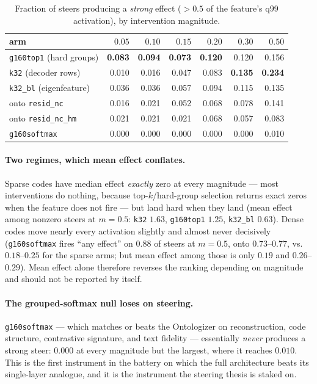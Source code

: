 \documentclass[11pt]{article}
\begin{document}
\begin{table}[h]\centering\small
\begin{tabular}{@{}lrrrrrr@{}}
\toprule
arm & $0.05$ & $0.10$ & $0.15$ & $0.20$ & $0.30$ & $0.50$ \\
\midrule
\texttt{g160top1} (hard groups)   & \textbf{0.083} & \textbf{0.094} & \textbf{0.073} & \textbf{0.120} & 0.120 & 0.156 \\
\texttt{k32} (decoder rows)       & 0.010 & 0.016 & 0.047 & 0.083 & \textbf{0.135} & \textbf{0.234} \\
\texttt{k32\_bl} (eigenfeature)   & 0.036 & 0.036 & 0.057 & 0.094 & 0.115 & 0.135 \\
onto \texttt{resid\_nc}           & 0.016 & 0.021 & 0.052 & 0.068 & 0.078 & 0.141 \\
onto \texttt{resid\_nc\_hm}       & 0.021 & 0.021 & 0.021 & 0.068 & 0.057 & 0.083 \\
\texttt{g160softmax}              & 0.000 & 0.000 & 0.000 & 0.000 & 0.000 & 0.010 \\
\bottomrule
\end{tabular}
\caption{Fraction of steers producing a \emph{strong} effect ($>0.5$ of
the feature's q99 activation), by intervention magnitude.}
\end{table}

\paragraph{Two regimes, which mean effect conflates.}
Sparse codes have median effect \emph{exactly} zero at every magnitude ---
most interventions do nothing, because top-$k$/hard-group selection returns
exact zeros when the feature does not fire --- but land hard when they land
(mean effect among nonzero steers at $m{=}0.5$: \texttt{k32} $1.63$,
\texttt{g160top1} $1.25$, \texttt{k32\_bl} $0.63$). Dense codes move nearly
every activation slightly and almost never decisively (\texttt{g160softmax}
fires ``any effect'' on $0.88$ of steers at $m{=}0.5$, onto $0.73$--$0.77$,
vs.\ $0.18$--$0.25$ for the sparse arms; but mean effect among those is
only $0.19$ and $0.26$--$0.29$). Mean effect alone therefore reverses the
ranking depending on magnitude and should not be reported by itself.

\paragraph{The grouped-softmax null loses on steering.}
\texttt{g160softmax} --- which matches or beats the Ontologizer on
reconstruction, code structure, contrastive signature, and text fidelity
--- essentially \emph{never} produces a strong steer: $0.000$ at every
magnitude but the largest, where it reaches $0.010$. This is the first
instrument in the battery on which the full architecture beats its
single-layer analogue, and it is the instrument the steering thesis is
staked on.
\end{document}
